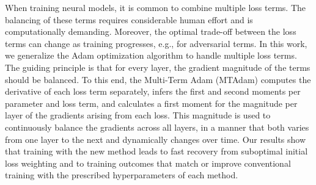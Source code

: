 When training neural models, it is common to combine multiple loss terms. The balancing of these terms requires considerable human effort and is computationally demanding. Moreover, the optimal trade-off between the loss terms can change as training progresses, e.g., for adversarial terms. In this work, we generalize the Adam optimization algorithm to handle multiple loss terms. The guiding principle is that for every layer, the gradient magnitude of the terms should be balanced. To this end, the Multi-Term Adam (MTAdam) computes the derivative of each loss term separately, infers the first and second moments per parameter and loss term, and calculates a first moment for the magnitude per layer of the gradients arising from each loss. This magnitude is used to continuously balance the gradients across all layers, in a manner that both varies from one layer to the next and dynamically changes over time. Our results show that training with the new method leads to fast recovery from suboptimal initial loss weighting and to training outcomes that {match or improve} conventional training with the prescribed hyperparameters of each method.
